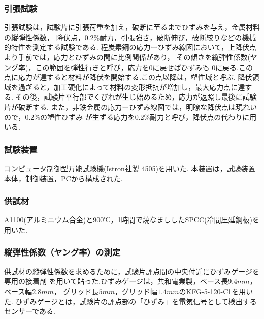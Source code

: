 \documentclass[10pt，a4j]{jsarticle}
\begin{document}
  \subsubsection{引張試験}
  引張試験は，試験片に引張荷重を加え，破断に至るまでひずみを与え，金属材料の縦弾性係数，
  降伏点，0.2\%耐力，引張強さ，破断伸び，破断絞りなどの機械的特性を測定する試験である.
  程炭素鋼の応力ーひずみ線図において，上降伏点より手前では，応力とひずみの間に比例関係があり，
  その傾きを縦弾性係数(ヤング率)，この範囲を弾性行きと呼び，応力を$0$に戻せばひずみも
  $0$に戻る.この点に応力が達すると材料が降伏を開始する.この点以降は，塑性域と呼ぶ.
  降伏領域を過ぎると，加工硬化によって材料の変形抵抗が増加し，最大応力点に達する.
  その後，試験片平行部でくびれが生じ始めるため，応力が返照し最後に試験片が破断する.
  また，非鉄金属の応力ーひずみ線図では，明瞭な降伏点は現れいので，0.2\%の塑性ひずみ
  が生ずる応力を0.2\%耐力と呼び，降伏点の代わりに用いる.
  \subsubsection{試験装置}
  コンピュータ制御型万能試験機(Istron社製 4505)を用いた.
  本装置は，試験装置本体，制御装置，PCから構成された.
  \subsubsection{供試材}
  A1100(アルミニウム合金)と900℃，1時間で焼なまししたSPCC(冷間圧延鋼板)を用いた.
  \subsubsection{縦弾性係数（ヤング率）の測定}
  供試材の縦弾性係数を求めるために，試験片評点間の中央付近にひずみゲージを専用の接着剤
  を用いて貼った.ひずみゲージは，共和電業製，ベース長$9.4mm$，ベース幅$2.8mm$，
  グリッド長$5mm$，グリッド幅$1.4mm$のKFG-5-120-C1を用いた.
  ひずみゲージとは，試験片の評点部の「ひずみ」を電気信号として検出するセンサーである.
\end{document}
